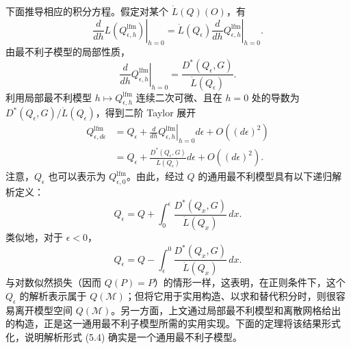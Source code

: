 下面推导相应的积分方程。假定对某个 $\dot L(Q)(O)$，有
\[
 \left.\frac{d}{dh}L(Q_{\epsilon,h}^{\mathrm{lfm}})\right|_{h=0}
 =\dot L(Q_\epsilon)
 \left.\frac{d}{dh}Q_{\epsilon,h}^{\mathrm{lfm}}\right|_{h=0}.
\]
由最不利子模型的局部性质，
\[
 \left.\frac{d}{dh}Q_{\epsilon,h}^{\mathrm{lfm}}\right|_{h=0}
 =\frac{D^*(Q_\epsilon,G)}{\dot L(Q_\epsilon)}.
\]
利用局部最不利模型 $h\mapsto Q_{\epsilon,h}^{\mathrm{lfm}}$ 连续二次可微、且在 $h=0$ 处的导数为 $D^*(Q_\epsilon,G)/\dot L(Q_\epsilon)$，得到二阶 Taylor 展开
\[
 \begin{aligned}
 Q_{\epsilon,d\epsilon}^{\mathrm{lfm}}
 &=Q_\epsilon+
 \left.\frac{d}{dh}Q_{\epsilon,h}^{\mathrm{lfm}}\right|_{h=0}
 d\epsilon+O((d\epsilon)^2)\\
 &=Q_\epsilon+\frac{D^*(Q_\epsilon,G)}{\dot L(Q_\epsilon)}
 d\epsilon+O((d\epsilon)^2).
 \end{aligned}
\]
注意，$Q_\epsilon$ 也可以表示为 $Q_{\epsilon,0}^{\mathrm{lfm}}$。由此，经过 $Q$ 的通用最不利模型具有以下递归解析定义：
\begin{equation}
 Q_\epsilon=Q+\int_0^\epsilon
 \frac{D^*(Q_x,G)}{\dot L(Q_x)}\,dx.
 \tag{5.4}
\end{equation}
类似地，对于 $\epsilon<0$，
\[
 Q_\epsilon=Q-\int_\epsilon^0
 \frac{D^*(Q_x,G)}{\dot L(Q_x)}\,dx.
\]
与对数似然损失（因而 $Q(P)=P$）的情形一样，这表明，在正则条件下，这个 $Q_\epsilon$ 的解析表示属于 $Q(\mathcal M)$；但将它用于实用构造、以求和替代积分时，则很容易离开模型空间 $Q(\mathcal M)$。另一方面，上文通过局部最不利模型和离散网格给出的构造，正是这一通用最不利子模型所需的实用实现。下面的定理将该结果形式化，说明解析形式 (5.4) 确实是一个通用最不利子模型。

